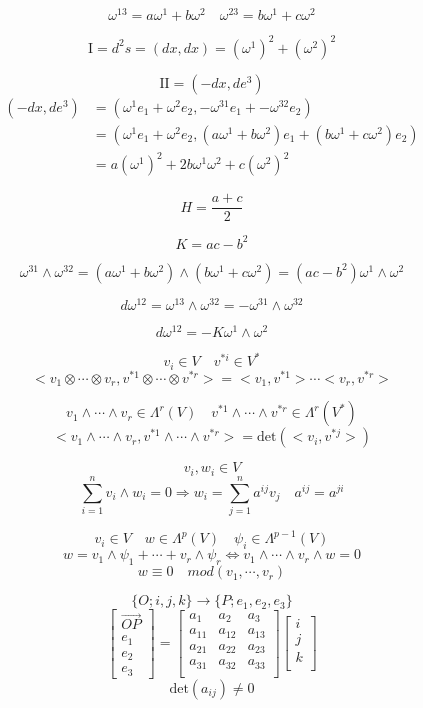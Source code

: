 \documentclass[12pt,a4paper]{article}
\begin{document}
\[
\omega^{13} = a\omega^1 + b \omega^2 \quad \omega^{23} = b\omega^1 + c\omega^2
\]

\[
\mathrm{I} = d^2s = (dx,dx) = (\omega^1)^2 + (\omega^2)^2
\] 

\[
\mathrm{II} = (-dx,de^3) 
\]
\begin{align*}
(-dx,de^3) & = (\omega^1e_1 + \omega^2 e_2, -\omega^{31}e_1 + -\omega^{32}e_2) \\
& = (\omega^1e_1 + \omega^2 e_2, (a\omega^1 + b \omega^2)e_1 + (b\omega^1+c\omega^2)e_2) \\
& = a(\omega^1)^2 + 2b\omega^1\omega^2 + c(\omega^2)^2
\end{align*}

\[
H = \frac{a+c}{2}
\]

\[
K = ac-b^2 
\]

\[
\omega^{31} \wedge \omega^{32} = (a\omega^1 + b \omega^2) \wedge (b\omega^1+c\omega^2) = (ac-b^2) \omega^1 \wedge \omega^2
\]

\[
d\omega^{12} = \omega^{13} \wedge \omega^{32} = -\omega^{31} \wedge \omega^{32}
\]

\[
d\omega^{12}  =-K\omega^1 \wedge \omega^2
\]




\[
v_i \in V \quad v^{*i} \in V^*
\]
\[
<v_1 \otimes \cdots \otimes v_r, v^{*1} \otimes \cdots \otimes v^{*r}> = <v_1,v^{*1}>\cdots<v_r,v^{*r}>
\]

\[
v_1 \wedge \cdots \wedge v_r \in \Lambda^r(V) \quad v^{*1} \wedge \cdots \wedge v^{*r} \in \Lambda^r(V^*)
\]
\[
<v_1 \wedge \cdots \wedge v_r ,v^{*1} \wedge \cdots \wedge v^{*r} > = \mathrm{det}(<v_i,v^{*j}>)
\]

\[
v_i,w_i \in V
\]
\[
\sum_{i=1}^n v_i \wedge w_i = 0 \Rightarrow w_i = \sum_{j=1}^n a^{ij}v_j \quad a^{ij} = a^{ji}
\]

\[
v_i \in V \quad w \in \Lambda^p(V) \quad \psi_i \in \Lambda^{p-1}(V)
\]
\[
w = v_1 \wedge \psi_1 + \cdots +  v_r \wedge \psi_r \Leftrightarrow v_1 \wedge \cdots \wedge v_r \wedge w =0
\]
\[
w \equiv 0 \quad mod(v_1,\cdots, v_r)
\]


\[
\{O;i,j,k\} \rightarrow \{P;e_1,e_2,e_3\}
\]
\[
\left[
\begin{array}{c}
\overrightarrow{OP} \\ e_1 \\e_2 \\e_3
\end{array}
\right] = \left[
\begin{array}{ccc}
a_1 & a_2 & a_3 \\
a_{11} & a_{12} & a_{13} \\
a_{21} & a_{22} & a_{23} \\
a_{31} & a_{32} & a_{33} \\
\end{array}
\right] \left[
\begin{array}{c}
i \\j\\k\\
\end{array}
\right]
\]
\[
\mathrm{det}(a_{ij}) \neq 0
\]
\end{document}
